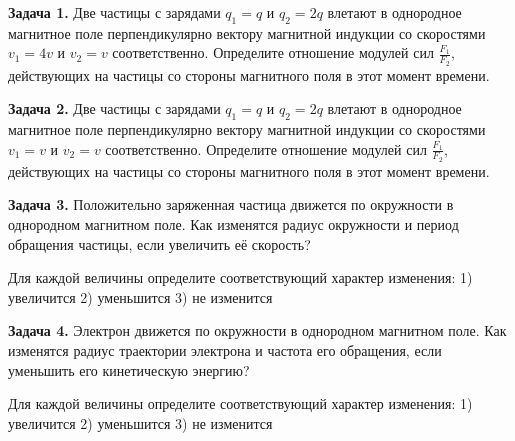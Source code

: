 
\begin{taskbasic}[code={\label{task:elem_mag_v13_n12}}]
\textbf{Задача 1.} Две частицы с зарядами $q_1 = q$ и $q_2 = 2q$ влетают в однородное магнитное поле перпендикулярно вектору магнитной индукции со скоростями $v_1 = 4v$ и $v_2 = v$ соответственно. Определите отношение модулей сил $\frac{F_1}{F_2}$, действующих на частицы со стороны магнитного поля в этот момент времени.

\end{taskbasic}

\begin{taskbasic}[code={\label{task:elem_mag_v14_n12}}]
\textbf{Задача 2.} Две частицы с зарядами $q_1 = q$ и $q_2 = 2q$ влетают в однородное магнитное поле перпендикулярно вектору магнитной индукции со скоростями $v_1 = v$ и $v_2 = v$ соответственно. Определите отношение модулей сил $\frac{F_1}{F_2}$, действующих на частицы со стороны магнитного поля в этот момент времени.

\end{taskbasic}

\begin{taskbasic}[code={\label{task:elem_mag_v17_n15}}]
\textbf{Задача 3.} Положительно заряженная частица движется по окружности в однородном магнитном поле. Как изменятся радиус окружности и период обращения частицы, если увеличить её скорость?

Для каждой величины определите соответствующий характер изменения:
1) увеличится
2) уменьшится
3) не изменится

\end{taskbasic}

\begin{taskbasic}[code={\label{task:elem_mag_v18_n15}}]
\textbf{Задача 4.} Электрон движется по окружности в однородном магнитном поле. Как изменятся радиус траектории электрона и частота его обращения, если уменьшить его кинетическую энергию?

Для каждой величины определите соответствующий характер изменения:
1) увеличится
2) уменьшится
3) не изменится

\end{taskbasic}

